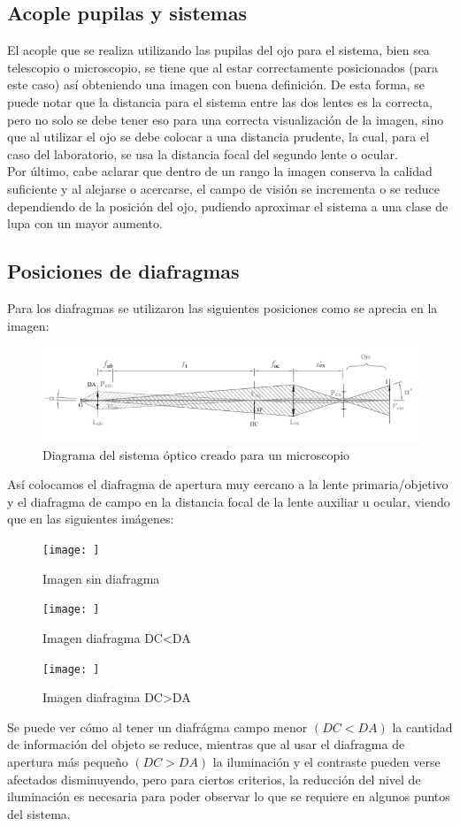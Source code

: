 \documentclass[5p,letterpaper]{article}
\begin{document}
\subsection{Acople pupilas y sistemas}
El acople que se realiza utilizando las pupilas del ojo para el sistema, bien sea telescopio o microscopio, se tiene que al estar correctamente posicionados (para este caso) así obteniendo una imagen con buena definición. De esta forma, se puede notar que la distancia para el sistema entre las dos lentes es la correcta, pero no solo se debe tener eso para una correcta visualización de la imagen, sino que al utilizar el ojo se debe colocar a una distancia prudente, la cual, para el caso del laboratorio, se usa la distancia focal del segundo lente o ocular. \\
Por último, cabe aclarar que dentro de un rango la imagen conserva la calidad suficiente y al alejarse o acercarse, el campo de visión se incrementa o se reduce dependiendo de la posición del ojo, pudiendo aproximar el sistema a una clase de lupa con un mayor aumento.

\subsection{Posiciones de diafragmas}

Para los diafragmas se utilizaron las siguientes posiciones como se aprecia en la imagen:
\begin{figure} [H]
    \centering
    \includegraphics[width=0.5\linewidth]{Imagenes/optica diafragma lab 04.jpeg}
    \caption{Diagrama del sistema óptico creado para un microscopio}
    \label{fig:placeholder}
\end{figure}
Así colocamos el diafragma de apertura muy cercano a la lente primaria/objetivo y el diafragma de campo en la distancia focal de la lente auxiliar u ocular, viendo que en las siguientes imágenes:
\begin{figure}[H]
    \centering
    \texttt{[image: ]}
    \caption{Imagen sin diafragma}
    \label{fig:placeholder}
\end{figure}
\begin{figure}[H]
    \centering
    \texttt{[image: ]}
    \caption{Imagen diafragma DC<DA}
    \label{fig:placeholder}
\end{figure}
\begin{figure}[H]
    \centering
    \texttt{[image: ]}
    \caption{Imagen diafragma DC>DA}
    \label{fig:placeholder}
\end{figure}
Se puede ver cómo al tener un diafrágma campo menor $(DC<DA)$ la cantidad de información del objeto se reduce, mientras que al usar el diafragma de apertura más pequeño $(DC>DA)$ la iluminación y el contraste pueden verse afectados disminuyendo, pero para ciertos criterios, la reducción del nivel de iluminación es necesaria para poder observar lo que se requiere en algunos puntos del sistema.
\end{document}
